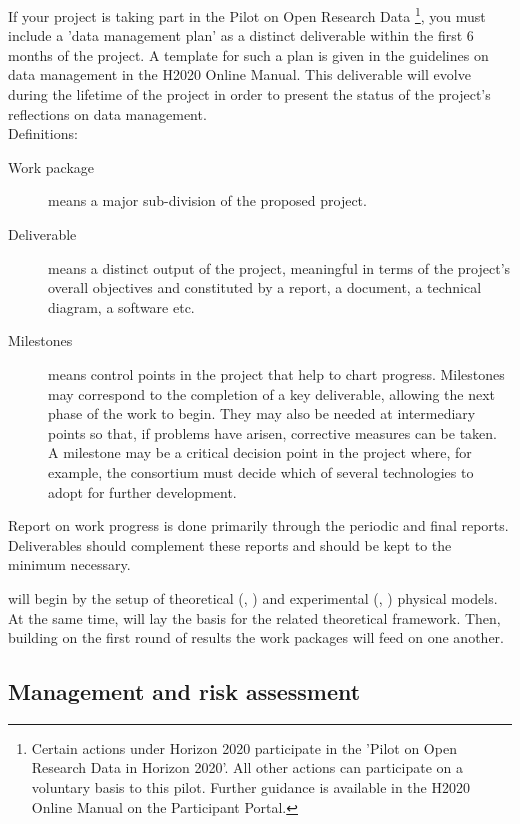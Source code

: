 {%
If your project is taking part in the Pilot on Open Research Data%
\footnote{%
  Certain actions under Horizon 2020 participate in the 'Pilot on Open Research
  Data in Horizon 2020'. All other actions can participate on a voluntary basis
  to this pilot. Further guidance is available in the H2020 Online Manual on the
  Participant Portal.},
you must include a 'data management plan' as a distinct deliverable within the
first 6 months of the project. A template for such a plan is given in the
guidelines on data management in the H2020 Online Manual. This deliverable will
evolve during the lifetime of the project in order to present the status of the
project's reflections on data management.\\
%
Definitions:
\begin{description}
\item[Work package] means a major sub-division of the proposed project.
\item[Deliverable] means a distinct output of the project, meaningful in terms of the project's overall
  objectives and constituted by a report, a document, a technical diagram, a software etc.
\item[Milestones] means control points in the project that help to chart progress. Milestones
    may correspond to the completion of a key deliverable, allowing the next phase of the
    work to begin. They may also be needed at intermediary points so that, if problems have
    arisen, corrective measures can be taken. A milestone may be a critical decision point in
    the project where, for example, the consortium must decide which of several technologies
    to adopt for further development.
\end{description}
%
Report on work progress is done primarily through the periodic and final reports. Deliverables
should complement these reports and should be kept to the minimum necessary.
}

\TheProject will begin by the setup of theoretical (,
) and experimental (, ) physical
models. At the same time,  will lay the basis for the related theoretical
framework.
%
Then, building on the first round of results the work packages will feed on one another.

\subsection{Management and risk assessment}

